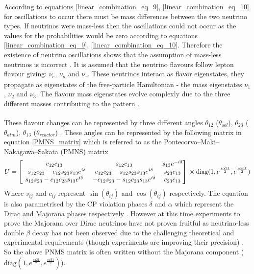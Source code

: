 According to equations \ref{linear_combination_eq_9}, \ref{linear_combination_eq_10} for oscillations to occur there must be mass differences between the two neutrino types. If neutrinos were mass-less then the oscillations could not occur as the values for the probabilities would be zero according to equations \ref{linear_combination_eq_9}, \ref{linear_combination_eq_10}. Therefore the existence of neutrino oscillations shows that the assumption of mass-less neutrinos is incorrect \cite{griffiths2008book}\cite{griffiths2008neutrinoOscillations} \cite{sassaroli1999neutrino}. It is assumed that the neutrino flavours follow lepton flavour giving: $\nu_e$, $\nu_\mu$ and $\nu_\tau$. These neutrinos interact as flavor eigenstates, they propagate as eigenstates of the free-particle Hamiltonian - the mass eigenstates $\nu_1$, $\nu_2$ and $\nu_3$. The flavour mass eigenstates evolve complexly due to the three different masses contributing to the pattern  \cite{griffiths2008book} \cite{griffiths2008neutrinoOscillations}. 
\\\\These flavour changes can be represented by three different angles $\theta_{12}$ ($\theta_{sol}$), $\theta_{23}$ ($\theta_{atm}$), $\theta_{13}$ ($\theta_{reactor}$) \cite{Olive_2014} \cite{griffiths2008book} \cite{griffiths2008neutrinoOscillations}. These angles can be represented by the following  matrix in equation \ref{PMNS_matrix} which is referred to as the Pontecorvo–Maki–Nakagawa–Sakata (PMNS) matrix
\begin{equation}
U
    =
    \begin{bmatrix}
        c_{12}c_{13} & s_{12}c_{13} & s_{13}e^{-i\delta}\\
        -s_{12}c_{23} - c_{12}s_{23}s_{13}e^{i\delta} & c_{12}c_{23} - s_{12}s_{23}s_{13}e^{i\delta} & s_{23}c_{13} \\
        s_{12}s_{23} - c_{12}c_{23}s_{13}e^{i\delta} & -c_{12}s_{23} - s_{12}c_{23}s_{13}e^{i\delta} & c_{23}c_{13} 
    \end{bmatrix}
    \\ \times \text{diag}(1, e^{\frac{i\alpha21}{2}} , e^{\frac{i\alpha31}{2}})
    \label{PMNS_matrix}
\end{equation}
Where $s_{ij}$ and $c_{ij}$ represent $\sin(\theta_{ij})$ and $\cos(\theta_{ij})$ respectively. The equation is also parametrised by the CP violation phases $\delta$ and $\alpha$ which represent the Dirac and Majorana phases respectively \cite{Olive_2014}. However at this time experiments to prove the Majorana over Dirac neutrinos have not proven fruitful as neutrino-less double $\beta$ decay has not been observed due to the challenging theoretical and experimental requirements (though experiments are improving their precision) \cite{Cardani_2019}.  So the above PNMS matrix is often written without the Majorana component ($\text{diag}(1, e^{\frac{i\alpha21}{2}} , e^{\frac{i\alpha31}{2}})$). 
